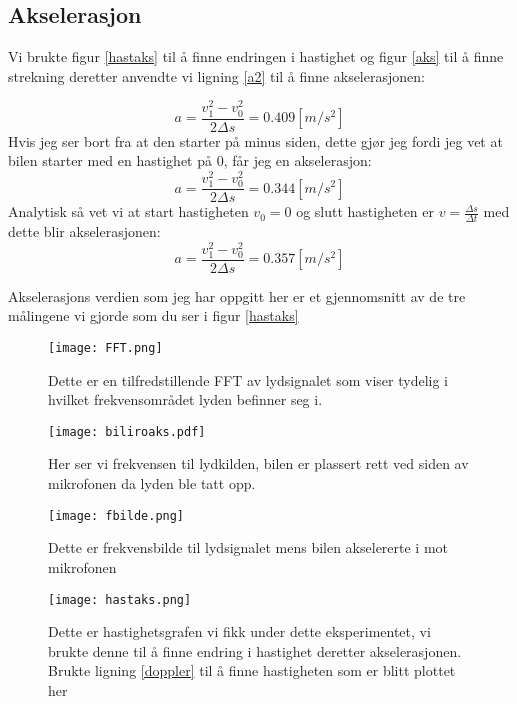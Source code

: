 \documentclass[norsk,a4paper,12pt]{article}
\begin{document}
\newpage
\subsection{Akselerasjon}

Vi brukte figur \vref{hastaks} til å finne endringen i hastighet og figur \vref{aks} til å finne strekning deretter anvendte vi ligning \ref{a2} til å finne akselerasjonen:

$$
a = \frac{v_1^2-v_0^2}{2 \Delta s} = 0.409[m/s^2]
$$
Hvis jeg ser bort fra at den starter på minus siden, dette gjør jeg fordi jeg vet at bilen starter med en hastighet på 0, får jeg en akselerasjon:
$$
a = \frac{v_1^2-v_0^2}{2 \Delta s} = 0.344[m/s^2]
$$
Analytisk så vet vi at start hastigheten $v_0=0$ og slutt hastigheten er $v=\frac{\Delta s}{\Delta t}$ med dette blir akselerasjonen:
$$
a = \frac{v_1^2-v_0^2}{2 \Delta s} = 0.357[m/s^2]
$$

Akselerasjons verdien som jeg har oppgitt her er et gjennomsnitt av de tre målingene vi gjorde som du ser i figur \vref{hastaks}

\begin{figure}[h!]
	\begin{minipage}{.5\linewidth}
	\centering
	\texttt{[image: FFT.png]}
	\caption[FFT av lydsignalet]{Dette er en tilfredstillende FFT av lydsignalet som viser tydelig i hvilket frekvensområdet lyden befinner seg i.}
	\end{minipage}
	\hspace{.5cm}
	\begin{minipage}{.5\linewidth}
	\texttt{[image: biliroaks.pdf]}
	\caption[Frekvensen til lydkilden]{Her ser vi frekvensen til lydkilden, bilen er plassert rett ved 		siden av mikrofonen da lyden ble tatt opp.}
	\label{biliroaks}
	\end{minipage}
\end{figure}

\begin{figure}[h!]
	\begin{minipage}{.5\linewidth}
	\centering
	\texttt{[image: fbilde.png]}
	\caption[Frekvens bilde]{Dette er frekvensbilde til lydsignalet mens bilen akselererte i mot
	mikrofonen}
	\label{frekaks}
	\end{minipage}
	\hspace{.5cm}
	\begin{minipage}{.5\linewidth}
	\centering
	\texttt{[image: hastaks.png]}
	\caption[Hastighetsgraf]{Dette er hastighetsgrafen vi fikk under dette eksperimentet, vi brukte 		denne til å finne endring i hastighet deretter akselerasjonen. Brukte ligning \vref{doppler} til å 
	finne hastigheten som er blitt plottet her}
	\label{hastaks}
	\end{minipage}
\end{figure}
\end{document}
